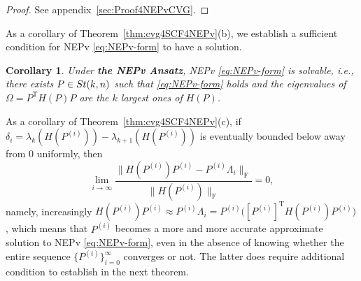 \documentclass[11pt]{article}
\newcommand\STM[2]{{\rm St}(#1,#2)}
\DeclareMathOperator{\F}{F}
\DeclareMathOperator{\T}{T}
\newtheorem{corollary}{Corollary}[section]
\theoremstyle{definition}
\numberwithin{equation}{section}
\begin{document}
\begin{proof}
See appendix~\ref{sec:Proof4NEPvCVG}.
\end{proof}





As a corollary of Theorem~\ref{thm:cvg4SCF4NEPv}(b), we establish a sufficient condition for NEPv \eqref{eq:NEPv-form} to have a solution.

\begin{corollary}\label{cor:cvg4SCF4NEPv}
Under {\bf the NEPv Ansatz},
NEPv \eqref{eq:NEPv-form} is solvable, i.e., there exists $P\in\STM{k}{n}$ such that
  \eqref{eq:NEPv-form} holds and
the eigenvalues of $\Omega=P^{\T}H(P)P$ are the $k$ largest ones of $H(P)$.
\end{corollary}

As a corollary of Theorem~\ref{thm:cvg4SCF4NEPv}(c),
if $\delta_i=\lambda_k(H(P^{(i)}))-\lambda_{k+1}(H(P^{(i)}))$ is eventually bounded below away from $0$ uniformly, then
$$
\lim_{i\to\infty}\frac {\big\|H(P^{(i)})P^{(i)}-P^{(i)}\Lambda_i\big\|_{\F}}
                       {\big\|H(P^{(i)})\big\|_{\F}}=0,
$$
namely, increasingly $H(P^{(i)})P^{(i)}\approx P^{(i)}\Lambda_i=P^{(i)}\big([P^{(i)}]^{\T}H(P^{(i)})P^{(i)}\big)$,
which means that $P^{(i)}$ becomes a more and more accurate approximate solution
to NEPv \eqref{eq:NEPv-form}, even in the absence of knowing whether the entire sequence $\{P^{(i)}\}_{i=0}^{\infty}$ converges or not. The latter does require additional condition to establish in the next theorem.
\end{document}

